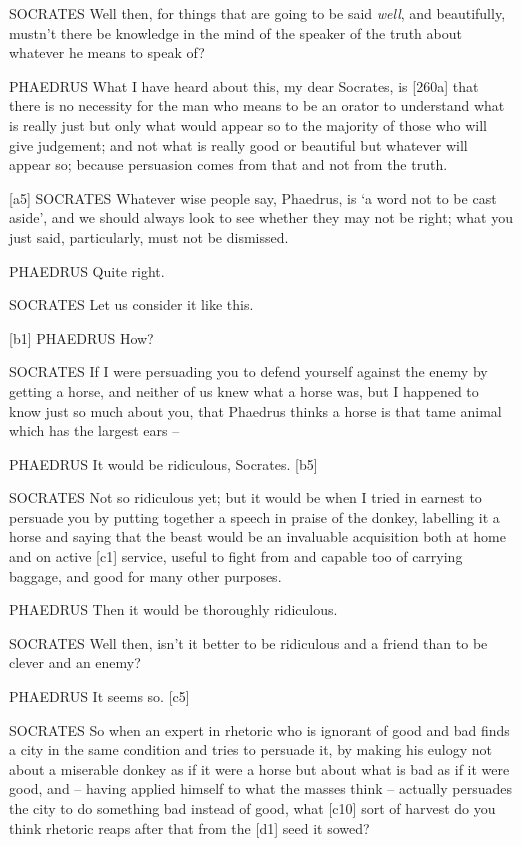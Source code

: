 SOCRATES Well then, for things that are going to be said {\em well}, and
beautifully, mustn't there be knowledge in the mind of the speaker of
the truth about whatever he means to speak of?

PHAEDRUS What I have heard about this, my dear Socrates, is {[}260a{]}
that there is no necessity for the man who means to be an orator to
understand what is really just but only what would appear so to the
majority of those who will give judgement; and not what is really good
or beautiful but whatever will appear so; because persuasion comes from
that and not from the truth.

{[}a5{]} SOCRATES Whatever wise people say, Phaedrus, is ‘a word not to
be cast aside', and we
should always look to see whether they may not be right; what you just
said, particularly, must not be dismissed.

PHAEDRUS Quite right.

SOCRATES Let us consider it like this.

{[}b1{]} PHAEDRUS How?

SOCRATES If I were persuading you to defend yourself against the enemy
by getting a horse, and neither of us knew what a horse was, but I
happened to know just so much about you, that Phaedrus thinks a horse is
that tame animal which has the largest ears --

PHAEDRUS It would be ridiculous, Socrates. {[}b5{]}

SOCRATES Not so ridiculous yet; but it would be when I tried in earnest
to persuade you by putting together a speech in praise of the donkey,
labelling it a horse and saying that the beast would be an invaluable
acquisition both at home and on active {[}c1{]} service, useful to fight
from and capable too of carrying baggage, and good for many other
purposes.

PHAEDRUS Then it would be thoroughly ridiculous.

SOCRATES Well then, isn't it better to be ridiculous and a friend than
to be clever and an enemy?

PHAEDRUS It seems so. {[}c5{]}

SOCRATES So when an expert in rhetoric who is ignorant of good and bad
finds a city in the same condition and tries to persuade it, by making
his eulogy not about a miserable donkey as if it were a horse but about
what is bad as if it were good, and -- having applied himself to what
the masses think -- actually persuades the city to do something bad
instead of good, what {[}c10{]} sort of harvest do you think rhetoric
reaps after that from the {[}d1{]} seed it sowed?

